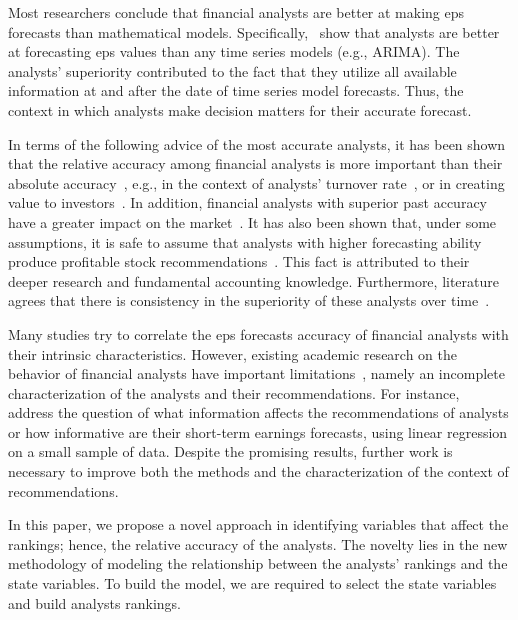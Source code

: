 \documentclass[a4paper,twoside,12pt,openright,notitlepage]{report}\usepackage[]{graphicx}\usepackage[]{color}
\begin{document}
Most researchers conclude that financial analysts are better at making \gls{eps} forecasts than mathematical models. Specifically,~\cite{fried1982,bouwman1987,brown1991} show that analysts are better at forecasting \gls{eps} values than any time series models (e.g., ARIMA). The analysts' superiority contributed to the fact that they utilize all available information at and after the date of time series model forecasts. Thus, the context in which analysts make decision matters for their accurate forecast.


In terms of the following advice of the most accurate analysts, it has been shown that the relative accuracy among financial analysts is more important than their absolute accuracy~\citep{aiguzhinov2015a}, e.g., in the context of analysts’ turnover rate~\citep{michaely1999}, or in creating value to investors~\citep{aiguzhinov2015a}. In addition, financial analysts with superior past accuracy have a greater impact on the market~\citep{park2000analyst}. It has also been shown that, under some assumptions, it is safe to assume that analysts with higher forecasting ability produce profitable stock recommendations~\citep{loh2006aef}. This fact is attributed to their deeper research and fundamental accounting knowledge. Furthermore, literature agrees that there is consistency in the superiority of these analysts over time~\citep{li2005persistence,hilary2013}.


Many studies try to correlate the \gls{eps} forecasts accuracy of financial analysts with their intrinsic characteristics. However, existing academic research on the behavior of financial analysts have important limitations~\citep{clement1999,brown2003,ramnath2008faf}, namely an incomplete characterization of the analysts and their recommendations.  For instance,~\cite{ramnath2008faf} address the question of what information affects the recommendations of analysts or how informative are their short-term earnings forecasts, using linear regression on a small sample of data. Despite the promising results, further work is necessary to improve both the methods and the characterization of the context of recommendations.

In this paper, we propose a novel approach in identifying variables that affect the rankings; hence, the relative accuracy of the analysts. The novelty lies in the new  methodology of modeling the relationship between the analysts' rankings and the state variables. To build the model, we are required to select the state variables and build analysts rankings.
\end{document}
